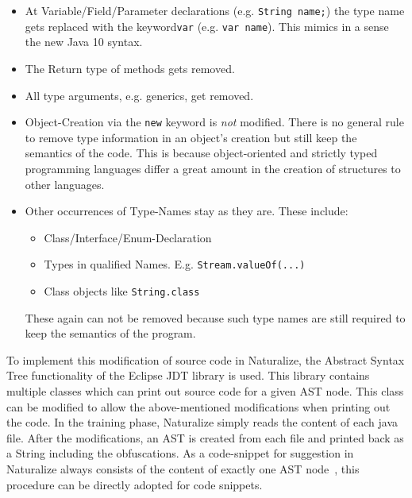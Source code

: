\begin{itemize}
    \item At Variable/Field/Parameter declarations (e.g. \texttt{String name;}) the type name gets replaced with the keyword\texttt{var} (e.g. \texttt{var name}). This mimics in a sense the new Java 10 syntax.
    \item The Return type of methods gets removed.
    \item All type arguments, e.g. generics, get removed.
    \item Object-Creation via the \texttt{new} keyword is \emph{not} modified. There is no general rule to remove type information in an object's creation but still keep the semantics of the code. This is because object-oriented and strictly typed programming languages differ a great amount in the creation of structures to other languages.
    \item Other occurrences of Type-Names stay as they are. These include:
    \begin{itemize}
        \item Class/Interface/Enum-Declaration
        \item Types in qualified Names. E.g. \texttt{Stream.valueOf(...)}
        \item Class objects like \texttt{String.class}
    \end{itemize}
    These again can not be removed because such type names are still required to keep the semantics of the program.
\end{itemize}

To implement this modification of source code in Naturalize, the Abstract Syntax Tree functionality of the Eclipse JDT library is used. This library contains multiple classes which can print out source code for a given AST node. This class can be modified to allow the above-mentioned modifications when printing out the code. In the training phase, Naturalize simply reads the content of each java file. After the modifications, an AST is created from each file and printed back as a String including the obfuscations. As a code-snippet for suggestion in Naturalize always consists of the content of exactly one AST node~\cite{naturalize}, this procedure can be directly adopted for code snippets.

